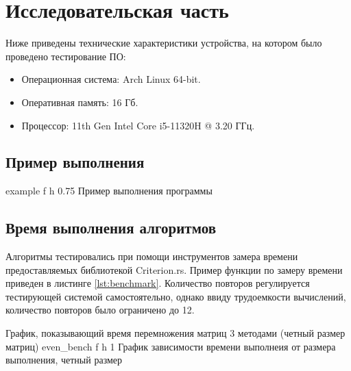 \chapter{Исследовательская часть}
Ниже приведены технические характеристики устройства, на котором было проведено тестирование ПО:

\begin{itemize}
    \item Операционная система: Arch Linux \cite{arch} 64-bit.
    \item Оперативная память: 16 Гб.
    \item Процессор: 11th Gen Intel\textsuperscript{\tiny\textregistered} Core\textsuperscript{\tiny\texttrademark} i5-11320H @ 3.20 ГГц\cite{i5}.
\end{itemize}

\section{Пример выполнения}
{example} %
{f} %
{h} %
{0.75\textwidth} %
{Пример выполнения программы} %
\clearpage

\section{Время выполнения алгоритмов}
Алгоритмы тестировались при помощи инструментов замера времени предоставляемых библиотекой Criterion.rs\cite{Criterion}.
Пример функции по замеру времени приведен в листинге \ref{lst:benchmark}.
Количество повторов регулируется тестирующей системой самостоятельно, однако ввиду трудоемкости вычислений, количество повторов было ограничено до 12.


\newpage
График, показывающий время перемножения матриц 3 методами (четный размер матриц)\newline
{}
{even_bench} %
{f} %
{h} %
{1\textwidth} %
{График зависимости времени выполнеия от размера выполнения, четный размер} %
\newpage


